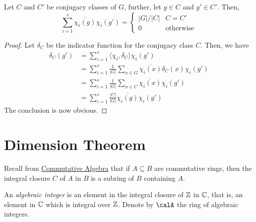 \begin{theorem}
    Let $C$ and $C'$ be conjugacy classes of $G$, further, let $g\in C$ and $g'\in C'$. Then, 
    \begin{equation*}
        \sum_{i = 1}^s\overline{\chi_i(g)}\chi_i(g') = 
        \begin{cases}
            |G|/|C| & C = C'\\
            0 & \text{otherwise}
        \end{cases}
    \end{equation*}
\end{theorem}
\begin{proof}
    Let $\delta_C$ be the indicator function for the conjugacy class $C$. Then, we have 
    \begin{align*}
        \delta_C(g') &= \sum_{i = 1}^s\langle\chi_i,\delta_C\rangle\chi_i(g')\\
        &= \sum_{i = 1}^s\frac{1}{|G|}\sum_{x\in G}\overline{\chi_i(x)}\delta_C(x)\chi_i(g')\\
        &= \sum_{i = 1}^s\frac{1}{|G|}\sum_{x\in C}\overline{\chi_i(x)}\chi_i(g')\\
        &= \sum_{i = 1}^s\frac{|C|}{|G|}\overline{\chi_i(g)}\chi_i(g')
    \end{align*}
    The conclusion is now obvious.
\end{proof}

\section{Dimension Theorem}

Recall from \href{https://swayamchube.github.io/research-interests/comm-alg/main.pdf}{Commutative Algebra} that if $A\subseteq B$ are commutative rings, then the integral closure $C$ of $A$ in $B$ is a subring of $B$ containing $A$.

\begin{definition}
    An \textit{algebraic integer} is an element in the integral closure of $\mathbb{Z}$ in $\mathbb{C}$, that is, an element in $\mathbb{C}$ which is integral over $\mathbb{Z}$. Denote by $\calA$ the ring of algebraic integers.
\end{definition}

